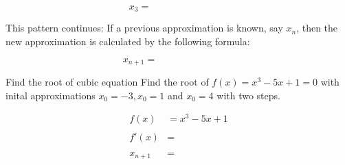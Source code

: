 \vspace{2cm}
\[
	x_{3} = \qquad \qquad \qquad \qquad
\]
\vspace{1cm}

This pattern continues: If a previous approximation is known, say $x_n$, then the new approximation is calculated by the following formula:

\begin{equation}
	x_{n+1 } = \qquad \qquad \qquad \qquad
	\label{eq:iteration}
\end{equation}


\begin{examplebox}{Find the root of cubic equation}
Find the root of $f(x) = x^{3}-5x+1 = 0 $ with inital approximations $x_{0 } = -3, x_{0 } = 1 $ and $x_{0 }=4 $ with two steps.
\end{examplebox}

\begin{align*}
	f(x) &= x^{3}-5x+1\\
			 &\\
	f'(x) &=\\
			 &\\
	x_{n+1} &=
\end{align*}

